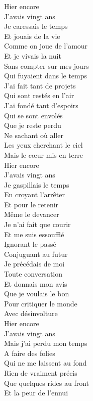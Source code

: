 \documentclass{novel}
\begin{document}
\begin{multicols}{2}
Hier encore \\
J'avais vingt ans \\
Je caressais le temps \\
Et jouais de la vie \\
Comme on joue de l'amour \\
Et je vivais la nuit \\
Sans compter sur mes jours \\
Qui fuyaient dans le temps \\

J'ai fait tant de projets \\
Qui sont restés en l'air \\
J'ai fondé tant d'espoirs \\
Qui se sont envolés \\
Que je reste perdu \\
Ne sachant où aller \\
Les yeux cherchant le ciel \\
Mais le cœur mis en terre \\

Hier encore \\
J'avais vingt ans \\
Je gaspillais le temps \\
En croyant l'arrêter \\
Et pour le retenir \\
Même le devancer \\
Je n'ai fait que courir \\
Et me suis essoufflé \\

Ignorant le passé \\
Conjuguant au futur \\
Je précédais de moi \\
Toute conversation \\
Et donnais mon avis \\
Que je voulais le bon \\
Pour critiquer le monde \\
Avec désinvolture \\

Hier encore \\
J'avais vingt ans \\
Mais j'ai perdu mon temps \\
A faire des folies \\
Qui ne me laissent au fond \\
Rien de vraiment précis \\
Que quelques rides au front \\
Et la peur de l'ennui \\


\end{multicols}
\end{document}
